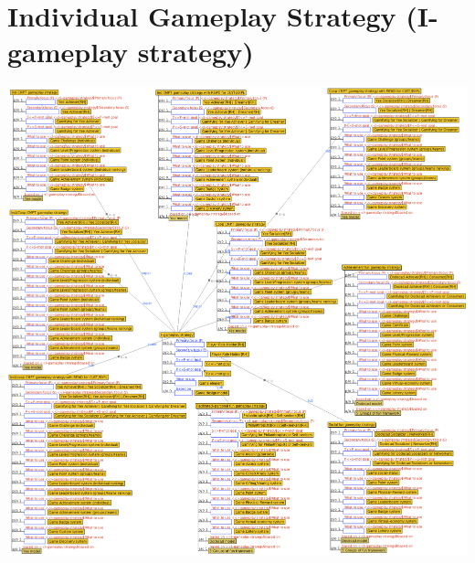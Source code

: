 \section{Individual Gameplay Strategy (I-gameplay strategy)}
\label{sec:ontogacles:individual-gameplay-strategy}
\includegraphics[width=1\textwidth]{images/appendix/ontological-structure-individual-gameplay-strategy.png}

